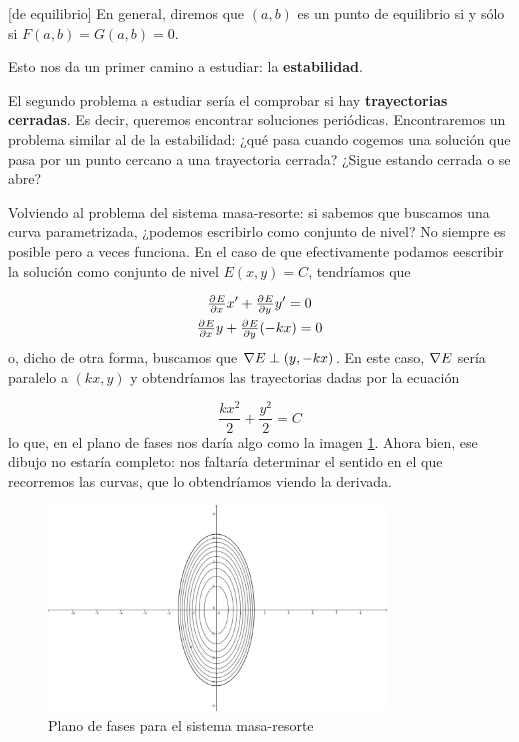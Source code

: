 \begin{definition}[de equilibrio]
En general, diremos que $(a,b)$ es un punto de equilibrio si y sólo si $F(a,b) = G(a,b) = 0$.
\end{definition}

Esto nos da un primer camino a estudiar: la \textbf{estabilidad}.

El segundo problema a estudiar sería el comprobar si hay \textbf{trayectorias cerradas}. Es decir, queremos encontrar soluciones periódicas. Encontraremos un problema similar al de la estabilidad: ¿qué pasa cuando cogemos una solución que pasa por un punto cercano a una trayectoria cerrada? ¿Sigue estando cerrada o se abre?

Volviendo al problema del sistema masa-resorte: si sabemos que buscamos una curva parametrizada, ¿podemos escribirlo como conjunto de nivel? No siempre es posible pero a veces funciona. En el caso de que efectivamente podamos eescribir la solución como conjunto de nivel $E(x,y) = C$, tendríamos que

\begin{gather*}
\pd{E}{x}  x' + \pd{E}{y}y' = 0 \\
\pd{E}{x} y + \pd{E}{y} (-kx) = 0
\end{gather*}
o, dicho de otra forma, buscamos que $\nabla E \perp (y,-kx)$. En este caso, $\nabla E$ sería paralelo a $(kx,y)$ y obtendríamos las trayectorias dadas por la ecuación

\[ \frac{kx^2}{2} + \frac{y^2}{2} = C 
\]
lo que, en el plano de fases nos daría algo como la imagen \ref{img:FasesMasaResorte}. Ahora bien, ese dibujo no estaría completo: nos faltaría determinar el sentido en el que recorremos las curvas, que lo obtendríamos viendo la derivada.

\begin{figure}[hbtp]
\centering
\includegraphics[width=0.8\textwidth]{img/PlanoFasesMasaResorte.png}
\caption{Plano de fases para el sistema masa-resorte}
\label{img:FasesMasaResorte}
\end{figure}

